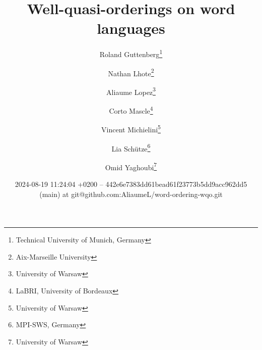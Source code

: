 %

\title{Well-quasi-orderings on word languages}
\author{%
        Roland Guttenberg\thanks{Technical University of Munich,
Germany}
     \and
        Nathan Lhote\thanks{Aix-Marseille University}
     \and
        Aliaume Lopez\thanks{University of Warsaw}
     \and
        Corto Mascle\thanks{LaBRI, University of Bordeaux}
     \and
        Vincent Michielini\thanks{University of Warsaw}
     \and
        Lia Schütze\thanks{MPI-SWS, Germany}
     \and
        Omid Yaghoubi\thanks{University of Warsaw}
    }

\date{2024-08-19 11:24:04
+0200 -- 442e6e7383dd61bead61f23773b5dd9acc962dd5 (main) at git@github.com:AliaumeL/word-ordering-wqo.git}

\newcommand{\makeabstract}{
\begin{abstract}
    The set of finite words over a well-quasi-ordered set is itself
    well-quasi-ordered. This seminal result by Higman is a cornerstone
    of the theory of well-quasi-orderings and has found numerous
    applications in computer science. However, this result is based on a
    specific choice of ordering on words, the (scattered) subword
    ordering. In this paper, we describe to what extent other natural
    orderings (prefix, suffix, infix) on words can be used to derive
    Higman-like theorems. More specifically, we are interested in
    characterizing \emph{languages} of words that are well-quasi-ordered
    under these orderings. We show that a simple characterization is
    possible for the prefix and suffix orderings, and that under extra
    regularity assumptions, this also lifts to the infix ordering.
\end{abstract}
}

